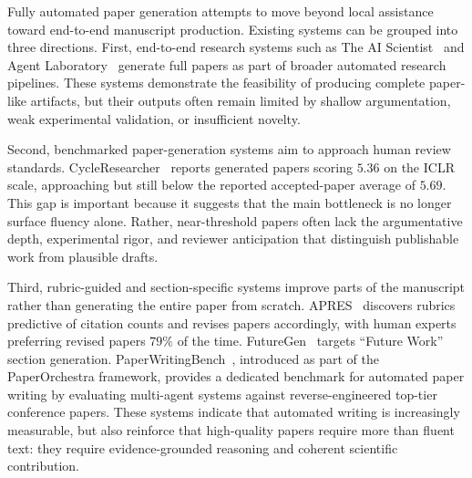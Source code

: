 \documentclass{llmxive}
\begin{document}
Fully automated paper generation attempts to move beyond local assistance toward end-to-end manuscript production. Existing systems can be grouped into three directions. First, end-to-end research systems such as The AI Scientist~\cite{lu2024aiscientist,aiscientistnature2026} and Agent Laboratory~\cite{schmidgall2025agentlab} generate full papers as part of broader automated research pipelines. These systems demonstrate the feasibility of producing complete paper-like artifacts, but their outputs often remain limited by shallow argumentation, weak experimental validation, or insufficient novelty.

Second, benchmarked paper-generation systems aim to approach human review standards. CycleResearcher~\cite{cycleresearcher2024} reports generated papers scoring $5.36$ on the ICLR scale, approaching but still below the reported accepted-paper average of $5.69$. This gap is important because it suggests that the main bottleneck is no longer surface fluency alone. Rather, near-threshold papers often lack the argumentative depth, experimental rigor, and reviewer anticipation that distinguish publishable work from plausible drafts.

Third, rubric-guided and section-specific systems improve parts of the manuscript rather than generating the entire paper from scratch. APRES~\cite{apres2026} discovers rubrics predictive of citation counts and revises papers accordingly, with human experts preferring revised papers $79\%$ of the time. FutureGen~\cite{futuregen2025} targets ``Future Work'' section generation. PaperWritingBench~\cite{paperwritingbench2026}, introduced as part of the PaperOrchestra framework, provides a dedicated benchmark for automated paper writing by evaluating multi-agent systems against reverse-engineered top-tier conference papers. These systems indicate that automated writing is increasingly measurable, but also reinforce that high-quality papers require more than fluent text: they require evidence-grounded reasoning and coherent scientific contribution.



\end{document}
